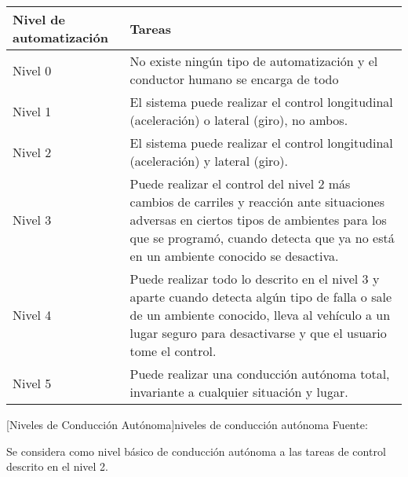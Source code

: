	\begingroup
	\begin{center}
		\footnotesize
		\begin{tabularx}{\textwidth}{|l|X|}
			\hline
			\textbf{Nivel de automatización} & \textbf{Tareas} \\
			\hline
			Nivel 0 & No existe ningún tipo de automatización y el conductor humano se encarga de todo \\
			\hline
			Nivel 1 & El sistema puede realizar el control longitudinal (aceleración) o lateral (giro), no ambos. \\
			\hline
			Nivel 2 & El sistema puede realizar el control longitudinal (aceleración) y lateral (giro). \\
			\hline
			Nivel 3 & Puede realizar el control del nivel 2 más cambios de carriles y reacción ante situaciones adversas en ciertos tipos de ambientes para los que se programó, cuando detecta que ya no está en un ambiente conocido se desactiva. \\
			\hline
			Nivel 4 & Puede realizar todo lo descrito en el nivel 3 y aparte cuando detecta algún tipo de falla o sale de un ambiente conocido, lleva al vehículo a un lugar seguro para desactivarse y que el usuario tome el control. \\
			\hline
			Nivel 5 & Puede realizar una conducción autónoma total, invariante a cualquier situación y lugar. \\
			\hline
		\end{tabularx}
		 
		[Niveles de Conducción Autónoma]{niveles de conducción autónoma Fuente:\citep{J3016_201806}}\label{niveles}
	\end{center}
	\endgroup
	\vspace{-4mm}
	Se considera como nivel básico de conducción autónoma a las tareas de control descrito en el nivel 2.